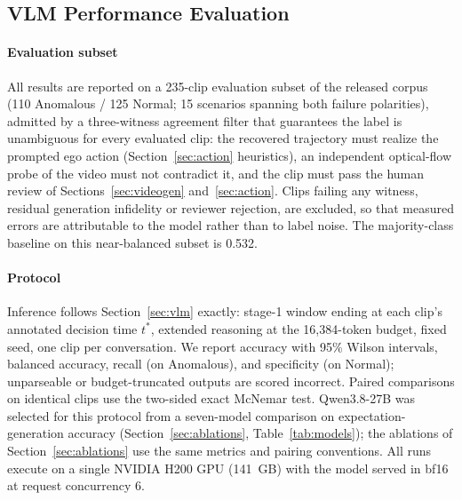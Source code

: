\documentclass[conference]{IEEEtran}
\begin{document}
\subsection{VLM Performance Evaluation}\label{sec:eval}

\paragraph{Evaluation subset} All results are reported on a 235-clip evaluation subset of the released corpus (110 Anomalous / 125 Normal; 15 scenarios spanning both failure polarities), admitted by a three-witness agreement filter that guarantees the label is unambiguous for every evaluated clip: the recovered trajectory must realize the prompted ego action (Section~\ref{sec:action} heuristics), an independent optical-flow probe of the video must not contradict it, and the clip must pass the human review of Sections~\ref{sec:videogen} and~\ref{sec:action}. Clips failing any witness, residual generation infidelity or reviewer rejection, are excluded, so that measured errors are attributable to the model rather than to label noise. The majority-class baseline on this near-balanced subset is 0.532.

\paragraph{Protocol} Inference follows Section~\ref{sec:vlm} exactly: stage-1 window ending at each clip's annotated decision time $t^*$, extended reasoning at the 16{,}384-token budget, fixed seed, one clip per conversation. We report accuracy with 95\% Wilson intervals, balanced accuracy, recall (on Anomalous), and specificity (on Normal); unparseable or budget-truncated outputs are scored incorrect. Paired comparisons on identical clips use the two-sided exact McNemar test. Qwen3.8-27B was selected for this protocol from a seven-model comparison on expectation-generation accuracy (Section~\ref{sec:ablations}, Table~\ref{tab:models}); the ablations of Section~\ref{sec:ablations} use the same metrics and pairing conventions. All runs execute on a single NVIDIA H200 GPU (141~GB) with the model served in bf16 at request concurrency 6.
\end{document}
